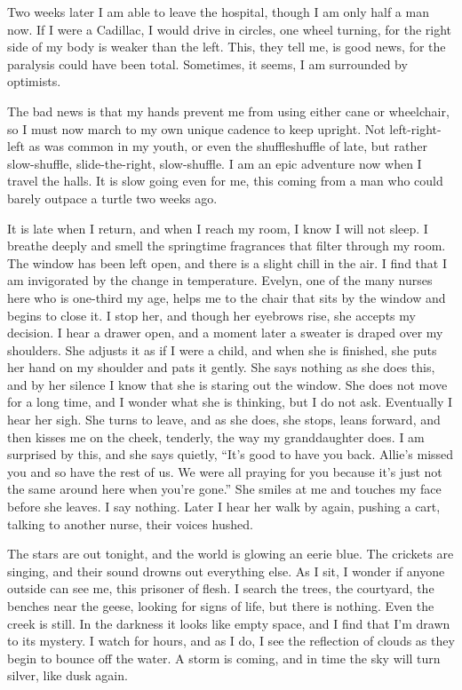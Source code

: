 \documentclass[10pt, twoside, openright]{book}
\begin{document}
Two weeks later I am able to leave the hospital, though I am only half a
man now. If I were a Cadillac, I would drive in circles, one wheel
turning, for the right side of my body is weaker than the left. This,
they tell me, is good news, for the paralysis could have been total.
Sometimes, it seems, I am surrounded by optimists.

The bad news is that my hands prevent me from using either cane or
wheelchair, so I must now march to my own unique cadence to keep
upright. Not left-right-left as was common in my youth, or even the
shuffleshuffle of late, but rather slow-shuffle, slide-the-right,
slow-shuffle. I am an epic adventure now when I travel the halls. It is
slow going even for me, this coming from a man who could barely outpace
a turtle two weeks ago.

It is late when I return, and when I reach my room, I know I will not
sleep. I breathe deeply and smell the springtime fragrances that filter
through my room. The window has been left open, and there is a slight
chill in the air. I find that I am invigorated by the change in
temperature. Evelyn, one of the many nurses here who is one-third my
age, helps me to the chair that sits by the window and begins to close
it. I stop her, and though her eyebrows rise, she accepts my decision. I
hear a drawer open, and a moment later a sweater is draped over my
shoulders. She adjusts it as if I were a child, and when she is
finished, she puts her hand on my shoulder and pats it gently. She says
nothing as she does this, and by her silence I know that she is staring
out the window. She does not move for a long time, and I wonder what she
is thinking, but I do not ask. Eventually I hear her sigh. She turns to
leave, and as she does, she stops, leans forward, and then kisses me on
the cheek, tenderly, the way my granddaughter does. I am surprised by
this, and she says quietly, ``It's good to have you back. Allie's missed
you and so have the rest of us. We were all praying for you because it's
just not the same around here when you're gone.'' She smiles at me and
touches my face before she leaves. I say nothing. Later I hear her walk
by again, pushing a cart, talking to another nurse, their voices hushed.

The stars are out tonight, and the world is glowing an eerie blue. The
crickets are singing, and their sound drowns out everything else. As I
sit, I wonder if anyone outside can see me, this prisoner of flesh. I
search the trees, the courtyard, the benches near the geese, looking for
signs of life, but there is nothing. Even the creek is still. In the
darkness it looks like empty space, and I find that I'm drawn to its
mystery. I watch for hours, and as I do, I see the reflection of clouds
as they begin to bounce off the water. A storm is coming, and in time
the sky will turn silver, like dusk again.
\end{document}
